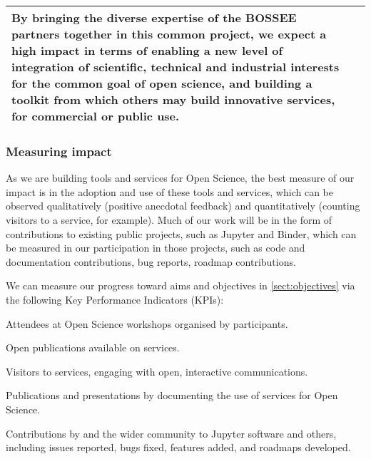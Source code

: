 \begin{center}
\begin{tabular}{|m{}|m{}|}
  By bringing the diverse expertise of the BOSSEE partners together in this
  common project, we expect a high impact in terms of enabling a new level of
  integration of scientific, technical and industrial interests for the common
  goal of open science,
  and building a toolkit from which others may build innovative services,
  for commercial or public use.

  \\\hline

\end{tabular}
\end{center}


\subsubsection{Measuring impact}

As we are building tools and services for Open Science,
the best measure of our impact is in the adoption and use of these tools and services,
which can be observed qualitatively (positive anecdotal feedback) and quantitatively
(counting visitors to a service, for example).
Much of our work will be in the form of contributions to existing public projects,
such as Jupyter and Binder,
which can be measured in our participation in those projects,
such as code and documentation contributions,
bug reports, roadmap contributions.

We can measure our progress toward aims and objectives in \ref{sect:objectives}
via the following
Key Performance Indicators (KPIs):

\begin{compactenum}
  \item \label{kpi:workshop-attendees}
    Attendees at Open Science workshops organised by \TheProject participants.
  \item \label{kpi:binder-publications}
    Open publications available on \TheProject services.
  \item \label{kpi:binder-visits}
    Visitors to \TheProject services, engaging with open, interactive communications.
  \item \label{kpi:dissemination}
    Publications and presentations by \TheProject documenting the use of \TheProject services for Open Science.
  \item \label{kpi:contributions}
    Contributions by \TheProject and the wider community to Jupyter software and others,
    including issues reported, bugs fixed,
    features added, and roadmaps developed.
\end{compactenum}

